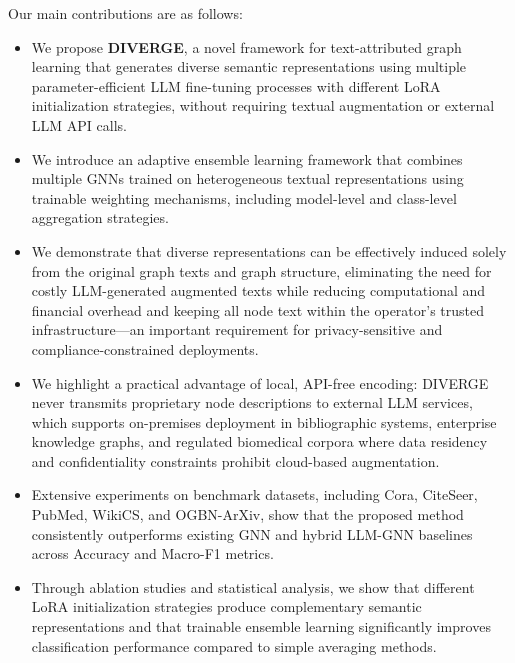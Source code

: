 \documentclass[a4paper,fleqn]{cas-sc}
\begin{document}
Our main contributions are as follows:
\begin{itemize}
	\item We propose \textbf{DIVERGE}, a novel framework for text-attributed graph learning that generates diverse semantic representations using multiple parameter-efficient LLM fine-tuning processes with different LoRA initialization strategies, without requiring textual augmentation or external LLM API calls.
	
	\item We introduce an adaptive ensemble learning framework that combines multiple GNNs trained on heterogeneous textual representations using trainable weighting mechanisms, including model-level and class-level aggregation strategies.
	
	\item We demonstrate that diverse representations can be effectively induced solely from the original graph texts and graph structure, eliminating the need for costly LLM-generated augmented texts while reducing computational and financial overhead and keeping all node text within the operator's trusted infrastructure---an important requirement for privacy-sensitive and compliance-constrained deployments.
\item We highlight a practical advantage of local, API-free encoding: DIVERGE never transmits proprietary node descriptions to external LLM services, which supports on-premises deployment in bibliographic systems, enterprise knowledge graphs, and regulated biomedical corpora where data residency and confidentiality constraints prohibit cloud-based augmentation.
	
	\item Extensive experiments on benchmark datasets, including Cora, CiteSeer, PubMed, WikiCS, and OGBN-ArXiv, show that the proposed method consistently outperforms existing GNN and hybrid LLM-GNN baselines across Accuracy and Macro-F1 metrics.
	
	\item Through ablation studies and statistical analysis, we show that different LoRA initialization strategies produce complementary semantic representations and that trainable ensemble learning significantly improves classification performance compared to simple averaging methods.
\end{itemize}
\end{document}
